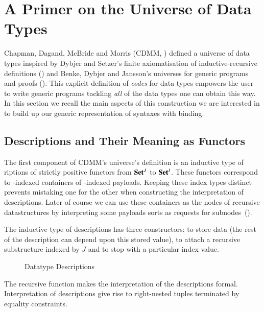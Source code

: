\chapter{A Primer on the Universe of Data Types}\label{section:data}

Chapman, Dagand, McBride and Morris (CDMM, \citeyear{Chapman:2010:GAL:1863543.1863547})
defined a universe of data types inspired by Dybjer and Setzer's
finite axiomatisation of inductive-recursive definitions (\citeyear{Dybjer1999})
and Benke, Dybjer and Jansson's universes for generic programs and proofs
(\citeyear{benke-ugpp}).
This explicit definition of \emph{codes} for data types empowers the
user to write generic programs tackling \emph{all} of the data types
one can obtain this way. In this section we recall the main aspects
of this construction we are interested in to build up our generic
representation of syntaxes with binding.

\section{Descriptions and Their Meaning as Functors}

The first component of CDMM's universe's definition is an inductive type of
riptions of strictly positive functors from $\mathbf{Set}{}^J$ to $\mathbf{Set}{}^I$.
%
These functors correspond to -indexed containers of -indexed
payloads. Keeping these index types distinct prevents mistaking one for the
other when constructing the interpretation of descriptions. Later of course
we can use these containers as the nodes of recursive datastructures by
interpreting some payloads sorts as requests for
subnodes~(\cite{DBLP:journals/jfp/AltenkirchGHMM15}).

The inductive type of descriptions has three constructors:
 to store data (the rest of the description can depend upon
this stored value),
%
 to attach a recursive substructure indexed by $J$
%
and  to stop with a particular index value.

\begin{figure}[h]
\caption{Datatype Descriptions\label{fig:datades}}
\end{figure}

The recursive function  makes the interpretation of the descriptions
formal. Interpretation of descriptions give rise to right-nested tuples
terminated by equality constraints.


